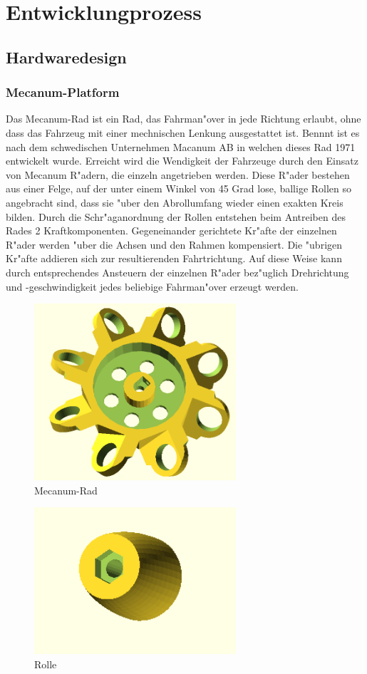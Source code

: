 \documentclass[a4paper,bibtotoc,oneside]{scrbook}
\begin{document}
\chapter{Entwicklungprozess}\thispagestyle{empty}

\section{Hardwaredesign}\thispagestyle{empty}
\subsection{Mecanum-Platform}\thispagestyle{empty}
Das Mecanum-Rad ist ein Rad, das Fahrman"over in jede Richtung erlaubt, ohne dass das Fahrzeug mit einer mechnischen Lenkung ausgestattet ist. Bennnt ist es nach dem schwedischen Unternehmen Macanum AB in welchen dieses Rad 1971 entwickelt wurde. 
Erreicht wird die Wendigkeit der Fahrzeuge durch den Einsatz von Mecanum R"adern, die einzeln angetrieben werden. Diese R"ader bestehen aus einer Felge, auf der unter einem Winkel von 45 Grad lose, ballige Rollen so angebracht sind, dass sie "uber den Abrollumfang wieder einen exakten Kreis bilden.
Durch die Schr"aganordnung der Rollen entstehen beim Antreiben des Rades 2 Kraftkomponenten. Gegeneinander gerichtete Kr"afte der einzelnen R"ader werden "uber die Achsen und den Rahmen kompensiert. Die "ubrigen Kr"afte addieren sich zur resultierenden Fahrtrichtung. Auf diese Weise kann durch entsprechendes Ansteuern der einzelnen R"ader bez"uglich Drehrichtung und -geschwindigkeit jedes beliebige Fahrman"over erzeugt werden.
\begin{figure}[htbp]
\centering
\includegraphics[width=75mm]{img/wheel.png}
\caption[Mecanum-Rad]{Mecanum-Rad}\label{rad}
\end{figure}

\begin{figure}[htbp]
\centering
\includegraphics[width=75mm]{img/roller.png}
\caption[Rolle]{Rolle}\label{rolle}
\end{figure}
\end{document}
